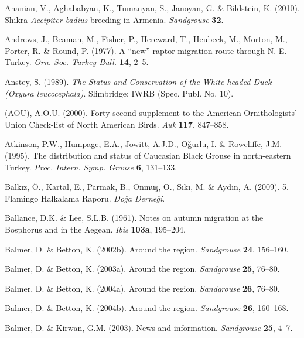 \documentclass[
  a4paper,
  DIV=11,
  numbers=noendperiod]{scrreprt}
\newlength{\cslhangindent}
\newenvironment{CSLReferences}[2] %
 {\begin{list}{}{%
  \setlength{\itemindent}{0pt}
  \setlength{\leftmargin}{0pt}
  \setlength{\parsep}{0pt}
  \ifodd #1
   \setlength{\leftmargin}{\cslhangindent}
   \setlength{\itemindent}{-1\cslhangindent}
  \fi
  \setlength{\itemsep}{#2\baselineskip}}}
 {\end{list}}
\begin{document}
\begin{CSLReferences}{1}{1}
Ananian, V., Aghababyan, K., Tumanyan, S., Janoyan, G. \& Bildstein, K.
(2010). {Shikra \emph{Accipiter badius} breeding in Armenia}.
\emph{Sandgrouse} \textbf{32}.

Andrews, J., Beaman, M., Fisher, P., Hereward, T., Heubeck, M., Morton,
M., Porter, R. \& Round, P. (1977). {A {``new''} raptor migration route
through N. E. Turkey}. \emph{Orn. Soc. Turkey Bull.} \textbf{14}, 2--5.

Anstey, S. (1989). \emph{{The Status and Conservation of the
White-headed Duck ({Oxyura leucocephala})}}. Slimbridge: IWRB (Spec.
Publ. No. 10).

(AOU), A.O.U. (2000). {Forty-second supplement to the American
Ornithologists' Union Check-list of North American Birds}. \emph{Auk}
\textbf{117}, 847--858.

Atkinson, P.W., Humpage, E.A., Jowitt, A.J.D., Oğurlu, I. \& Rowcliffe,
J.M. (1995). {The distribution and status of Caucasian Black Grouse in
north-eastern Turkey}. \emph{Proc. Intern. Symp. Grouse} \textbf{6},
131--133.

Balkız, Ö., Kartal, E., Parmak, B., Onmuş, O., Sıkı, M. \& Aydın, A.
(2009). {5. Flamingo Halkalama Raporu}. \emph{Doğa Derneği}.

Ballance, D.K. \& Lee, S.L.B. (1961). {Notes on autumn migration at the
Bosphorus and in the Aegean}. \emph{Ibis} \textbf{103a}, 195--204.

Balmer, D. \& Betton, K. (2002b). {Around the region}. \emph{Sandgrouse}
\textbf{24}, 156--160.

Balmer, D. \& Betton, K. (2003a). {Around the region}. \emph{Sandgrouse}
\textbf{25}, 76--80.

Balmer, D. \& Betton, K. (2004a). {Around the region}. \emph{Sandgrouse}
\textbf{26}, 76--80.

Balmer, D. \& Betton, K. (2004b). {Around the region}. \emph{Sandgrouse}
\textbf{26}, 160--168.

Balmer, D. \& Kirwan, G.M. (2003). {News and information}.
\emph{Sandgrouse} \textbf{25}, 4--7.


\end{CSLReferences}
\end{document}
